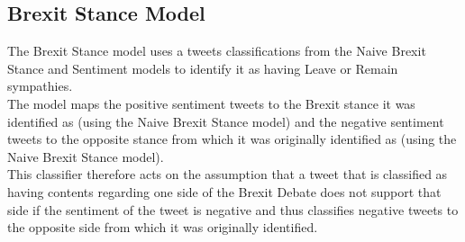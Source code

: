 \documentclass[11pt]{report}
\begin{document}
\subsection{Brexit Stance Model}
The Brexit Stance model uses a tweets classifications from the Naive Brexit Stance and
Sentiment models to identify it as having Leave or Remain sympathies.
\\

The model maps the positive sentiment tweets to the Brexit stance it was identified as
(using the Naive Brexit Stance model) and the negative sentiment tweets to the opposite
stance from which it was originally identified as (using the Naive Brexit Stance model).
\\

This classifier therefore acts on the assumption that a tweet that is classified as having
contents regarding one side of the Brexit Debate does not support that side if the sentiment
of the tweet is negative and thus classifies negative tweets to the opposite side from which
it was originally identified.
\end{document}
